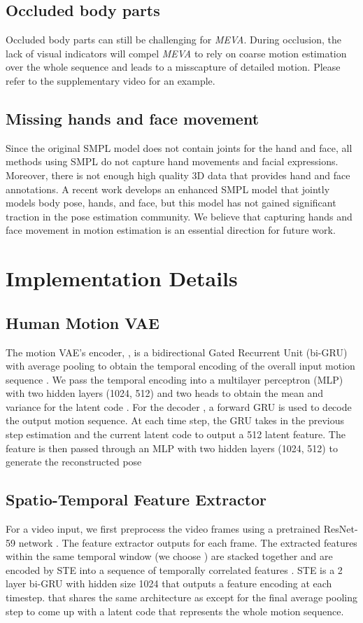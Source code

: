 \documentclass[runningheads]{llncs}
\begin{document}
\subsection{Occluded body parts}
Occluded body parts can still be challenging for \textit{MEVA}. During occlusion, the lack of visual indicators will compel \textit{MEVA} to rely on coarse motion estimation over the whole sequence and leads to a misscapture of detailed motion. Please refer to the supplementary video for an example. 


\subsection{Missing hands and face movement}
Since the original SMPL\cite{SMPL} model does not contain joints for the hand and face, all methods using SMPL do not capture hand movements and facial expressions. Moreover, there is not enough high quality 3D data that provides hand and face annotations. A recent work \cite{smplx} develops an enhanced SMPL model that jointly models body pose, hands, and face, but this model has not gained significant traction in the pose estimation community. We believe that capturing hands and face movement in motion estimation is an essential direction for future work.
\vspace{-0.5mm}
\section{Implementation Details}
\vspace{-0.5mm}
\subsection{Human Motion VAE}
The motion VAE's encoder, , is a bidirectional Gated Recurrent Unit (bi-GRU) with average pooling to obtain the temporal encoding  of the overall input motion sequence . We pass the temporal encoding  into a multilayer perceptron (MLP) with two hidden layers (1024, 512) and two heads to obtain the mean  and variance  for the latent code . For the decoder , a forward GRU is used to decode the output motion sequence. At each time step, the GRU takes in the previous step estimation  and the current latent code  to output a 512 latent feature. The feature is then passed through an MLP with two hidden layers (1024, 512) to generate the reconstructed pose 
\vspace{-0.5mm}
\subsection{ Spatio-Temporal Feature Extractor}
\vspace{-0.5mm}
For a video input, we first preprocess the video frames using a pretrained ResNet-59 network \cite{hmr}. The feature extractor outputs  for each frame. The extracted features within the same temporal window  (we choose ) are stacked together  and are encoded by STE into a sequence of temporally correlated features . STE is a 2 layer bi-GRU with hidden size 1024 that outputs a feature encoding at each timestep.  that shares the same architecture as  except for the final average pooling step to come up with a latent code  that represents the whole motion sequence. 
\end{document}
